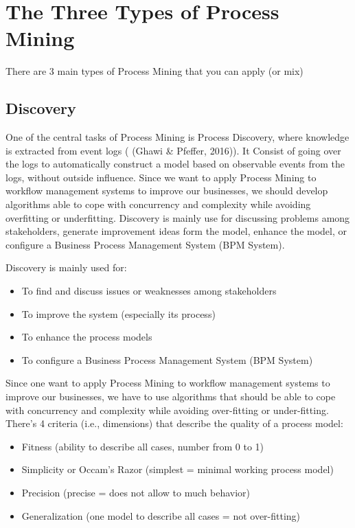 \documentclass[conference]{IEEEtran}
\begin{document}
\section{The Three Types of Process Mining}

There are 3 main types of Process Mining that you can apply (or mix)

\subsection{Discovery}

One of the central tasks of Process Mining is Process Discovery, where knowledge is extracted from event logs ( (Ghawi \& Pfeffer, 2016)). It Consist of going over the logs to automatically construct a model based on observable events from the logs, without outside influence. Since we want to apply Process Mining to workflow management systems to improve our businesses, we should develop algorithms able to cope with concurrency and complexity while avoiding overfitting or underfitting. Discovery is mainly use for discussing problems among stakeholders, generate improvement ideas form the model, enhance the model, or configure a Business Process Management System (BPM System).

Discovery is mainly used for:
\begin{itemize}
    \item To find and discuss issues or weaknesses among stakeholders
    \item To improve the system (especially its process)
    \item To enhance the process models
    \item To configure a Business Process Management System (BPM System)
\end{itemize}

Since one want to apply Process Mining to workflow management systems to improve our businesses, we have to use algorithms that should be able to cope with concurrency and complexity while avoiding over-fitting or under-fitting.\\

There's 4 criteria (i.e., dimensions) that describe the quality of a process model:
\begin{itemize}
    \item Fitness (ability to describe all cases, number from 0 to 1)
    \item Simplicity or Occam’s Razor (simplest = minimal working process model)
    \item Precision (precise = does not allow to much behavior)
    \item Generalization (one model to describe all cases = not over-fitting)
\end{itemize}
\end{document}
